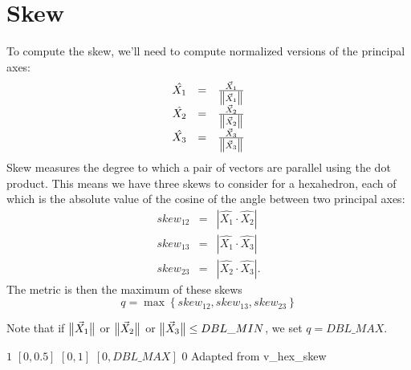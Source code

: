 \section{Skew\label{s:hex-skew}}

To compute the skew, we'll need to compute normalized versions of the principal axes:
\[
\begin{array}{lcl}
\hat{X_1} &=& \frac{\vec X_1}{\big\lVert{\vec X_1 }\big\rVert}\\
\hat{X_2} &=& \frac{\vec X_2}{\big\lVert{\vec X_2 }\big\rVert}\\
\hat{X_3} &=& \frac{\vec X_3}{\big\lVert{\vec X_3 }\big\rVert}
\end{array}
\]
Skew measures the degree to which a pair of vectors are parallel using the dot product.
This means we have three skews to consider for a hexahedron, each of which is the
absolute value of the cosine of the angle between two principal axes:
\[
\begin{array}{lcl}
skew_{12} &=& \left| \hat{X_1} \cdot \hat{X_2} \right|\\
skew_{13} &=& \left| \hat{X_1} \cdot \hat{X_3} \right|\\
skew_{23} &=& \left| \hat{X_2} \cdot \hat{X_3} \right|.
\end{array}
\]
The metric is then the maximum of these skews
\[
  q = \max\left\{ skew_{12}, skew_{13}, skew_{23} \right\}
\]

Note that if $\big\lVert{\vec X_1}\big\rVert$ or $\big\lVert{\vec X_2}\big\rVert$ or $\big\lVert{\vec X_3}\big\rVert \leq DBL\_MIN$, we set $q = DBL\_MAX$.

%
{$1$}%
{$[0,0.5]$}%
{$[0,1]$}%
{$[0,DBL\_MAX]$}%
{$0$}%
{Adapted from \cite{tf:89}}%
{v\_hex\_skew}%

